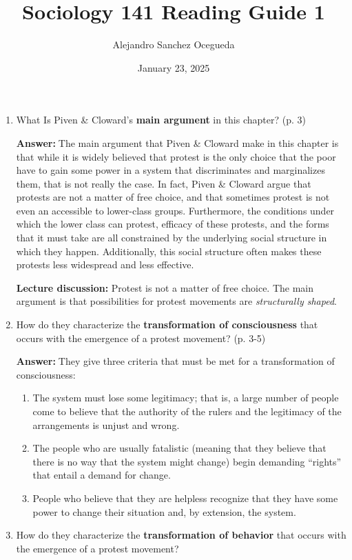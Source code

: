 \documentclass{article}
\title{Sociology 141 Reading Guide 1}
\author{Alejandro Sanchez Ocegueda}
\date{January 23, 2025}
\newcommand{\answer}{\textbf{Answer:}$\;$}
\begin{document}
\maketitle

\begin{enumerate}[label=\arabic*)]
    \item What Is Piven \& Cloward's \textbf{main argument} in this chapter? (p. 3)

    \answer The main argument that Piven \& Cloward make in this chapter is that while it is widely believed that protest is the only choice that the poor have to gain some power in a system that discriminates and marginalizes them, that is not really the case.
    In fact, Piven \& Cloward argue that protests are not a matter of free choice, and that sometimes protest is not even an accessible to lower-class groups.
    Furthermore, the conditions under which the lower class can protest, efficacy of these protests, and the forms that it must take are all constrained by the underlying social structure in which they happen.
    Additionally, this social structure often makes these protests less widespread and less effective.

    \textbf{Lecture discussion:} Protest is not a matter of free choice.
    The main argument is that possibilities for protest movements are \textit{structurally shaped}.

    \item How do they characterize the \textbf{transformation of consciousness} that occurs with the emergence of a protest movement? (p. 3-5)

    \answer They give three criteria that must be met for a transformation of consciousness:
    \begin{enumerate}
        \item The system must lose some legitimacy;
        that is, a large number of people come to believe that the authority of the rulers and the legitimacy of the arrangements is unjust and wrong.
        \item The people who are usually fatalistic (meaning that they believe that there is no way that the system might change) begin demanding ``rights'' that entail a demand for change.
        \item People who believe that they are helpless recognize that they have some power to change their situation and, by extension, the system.
    \end{enumerate}

    \item How do they characterize the \textbf{transformation of behavior} that occurs with the emergence of a protest movement?    


\end{enumerate}
\end{document}
